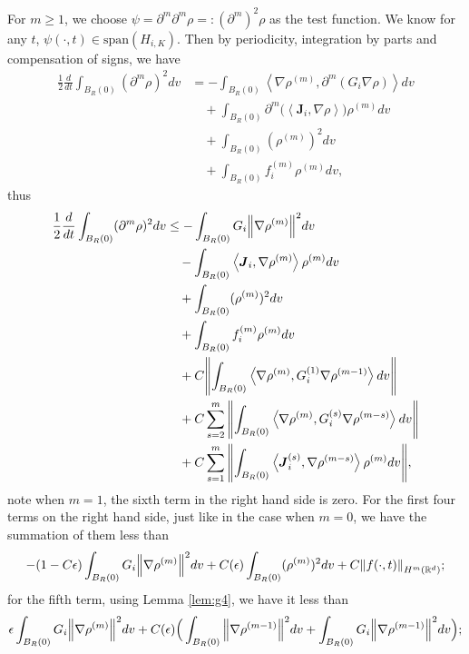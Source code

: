 \documentclass[a4paper, 11pt]{article}
\newcommand{\inner}[2]{\left< #1 , #2 \right>}
\theoremstyle{plain}
\theoremstyle{remark}
\theoremstyle{definition}
\newcommand{\intr}{\int_{B_R(0)}}
\newcommand{\J}{\boldsymbol{J}}
\begin{document}
		
		For $m\geq 1$, we choose $\psi=\partial^m\partial^m\rho=:(\partial^m)^2\rho$ as the test function. We know for any $t$, $\psi(\cdot,t)\in \mathrm{span}(H_{i,K})$. Then by periodicity, integration by parts and compensation of signs, we have
		\begin{equation}\label{eq:99}
			\begin{aligned}
				\frac{1}{2}\frac{d}{dt}\intr(\partial^m\rho)^2dv&=-\intr\inner{\nabla\rho^{(m)}}{\partial^m(G_i\nabla\rho)}dv\\
				&\quad+\intr\partial^m\Big(\inner{\J_i}{\nabla\rho}\Big)\rho^{(m)}dv\\
				&\quad+\intr(\rho^{(m)})^2dv\\
				&\quad+\intr f^{(m)}_i\rho^{(m)} dv,
			\end{aligned}
		\end{equation}
        thus
        \begin{equation}
            \begin{aligned}
    \frac{1}{2}\frac{d}{dt}\intr(\partial^m\rho)^2dv&\leq -\intr G_i\norm{\nabla\rho^{(m)}}^2 dv\\
&\quad-\intr\inner{\J_i}{\nabla\rho^{(m)}}\rho^{(m)}dv\\
&\quad+\intr(\rho^{(m)})^2dv\\
&\quad+\intr f_i^{(m)}\rho^{(m)} dv\\
&\quad +C\norm{\intr\inner{\nabla\rho^{(m)}}{G_i^{(1)}\nabla\rho^{(m-1)}}dv}\\
&\quad+C\sum_{s=2}^m\norm{\intr \inner{\nabla\rho^{(m)}}{G_i^{(s)}\nabla\rho^{(m-s)}}dv}\\
&\quad +C\sum_{s=1}^m\norm{\intr\inner{\J_i^{(s)}}{\nabla\rho^{(m-s)}}\rho^{(m)}dv},
            \end{aligned}
        \end{equation}
		note when $m=1$, the sixth term in the right hand side is zero. For the first four terms on the right hand side, just like in the case when $m=0$, we have the summation of them less than
		\begin{equation}
			-(1-C\epsilon)\intr G_i\norm{\nabla\rho^{(m)}}^2dv+C(\epsilon)\intr (\rho^{(m)})^2dv+C\norm{f(\cdot,t)}_{H^m(\mathbb{R}^d)};
		\end{equation}
		for the fifth term, using Lemma \ref{lem:g4}, we have it less than
		\begin{equation}
			\epsilon\intr G_i\norm{\nabla\rho^{(m)}}^2dv+C(\epsilon)\Big(\intr\norm{\nabla \rho^{(m-1)}}^2dv+\intr G_i\norm{\nabla\rho^{(m-1)}}^2dv\Big);
		\end{equation}
\end{document}
